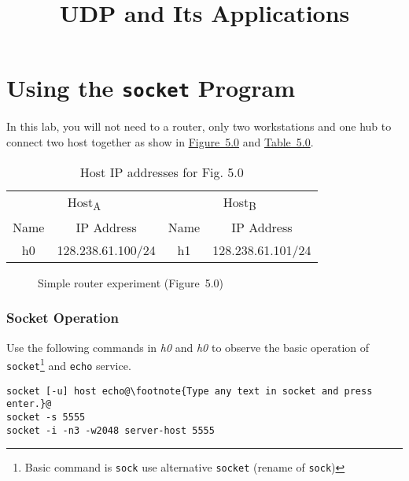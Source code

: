 \documentclass{../UTNetLab}
\title{UDP and Its Applications}
\begin{document}
\part{Using the \texttt{socket} Program}
\label{sec:schema}
    In this lab, you will not need to a router, only two workstations and one hub to connect two host together as show in \hyperref[fig:5.0]{Figure~5.0} and \hyperref[tab:5.0]{Table~5.0}.
    \begin{table}[H]
        \caption{Host IP addresses for Fig. 5.0}
        \label{tab:5.0}
        \centering
        \begin{tabular}{ *2c|*2c }
            \hline \hline
            \multicolumn{2}{c|}{Host\textsubscript{A}} & \multicolumn{2}{c}{Host\textsubscript{B}} \\
            Name & IP Address & Name & IP Address \\
            \hline 
            h0 & 128.238.61.100/24 & h1 & 128.238.61.101/24\\
            \hline \hline
            \end{tabular}
    \end{table}

    \begin{figure}[H]
        \centering
        \caption{Simple router experiment (Figure~5.0)}        
        \label{fig:5.0}
    \end{figure}

\section{Socket Operation}
    Use the following commands in \textit{h0} and \textit{h0} to observe the basic operation of \lstinline{socket}\footnote{Basic command is \lstinline{sock} use alternative \lstinline{socket} (rename of \lstinline{sock})} and \lstinline{echo} service.
    \begin{lstlisting}[emph={host, server-host}]
socket [-u] host echo@\footnote{Type any text in socket and press enter.}@
socket -s 5555
socket -i -n3 -w2048 server-host 5555
    \end{lstlisting}
\end{document}
